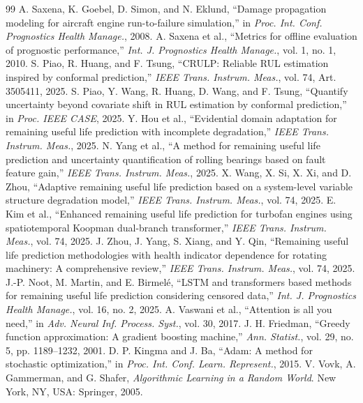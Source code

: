 \documentclass[journal]{IEEEtran}
\begin{document}
\begin{thebibliography}{99}
 A. Saxena, K. Goebel, D. Simon, and N. Eklund, ``Damage propagation modeling for aircraft engine run-to-failure simulation,'' in \emph{Proc. Int. Conf. Prognostics Health Manage.}, 2008.
 A. Saxena et al., ``Metrics for offline evaluation of prognostic performance,'' \emph{Int. J. Prognostics Health Manage.}, vol. 1, no. 1, 2010.
 S. Piao, R. Huang, and F. Tsung, ``CRULP: Reliable RUL estimation inspired by conformal prediction,'' \emph{IEEE Trans. Instrum. Meas.}, vol. 74, Art. 3505411, 2025.
 S. Piao, Y. Wang, R. Huang, D. Wang, and F. Tsung, ``Quantify uncertainty beyond covariate shift in RUL estimation by conformal prediction,'' in \emph{Proc. IEEE CASE}, 2025.
 Y. Hou et al., ``Evidential domain adaptation for remaining useful life prediction with incomplete degradation,'' \emph{IEEE Trans. Instrum. Meas.}, 2025.
 N. Yang et al., ``A method for remaining useful life prediction and uncertainty quantification of rolling bearings based on fault feature gain,'' \emph{IEEE Trans. Instrum. Meas.}, 2025.
 X. Wang, X. Si, X. Xi, and D. Zhou, ``Adaptive remaining useful life prediction based on a system-level variable structure degradation model,'' \emph{IEEE Trans. Instrum. Meas.}, vol. 74, 2025.
 E. Kim et al., ``Enhanced remaining useful life prediction for turbofan engines using spatiotemporal Koopman dual-branch transformer,'' \emph{IEEE Trans. Instrum. Meas.}, vol. 74, 2025.
 J. Zhou, J. Yang, S. Xiang, and Y. Qin, ``Remaining useful life prediction methodologies with health indicator dependence for rotating machinery: A comprehensive review,'' \emph{IEEE Trans. Instrum. Meas.}, vol. 74, 2025.
 J.-P. Noot, M. Martin, and E. Birmel\'e, ``LSTM and transformers based methods for remaining useful life prediction considering censored data,'' \emph{Int. J. Prognostics Health Manage.}, vol. 16, no. 2, 2025.
 A. Vaswani et al., ``Attention is all you need,'' in \emph{Adv. Neural Inf. Process. Syst.}, vol. 30, 2017.
 J. H. Friedman, ``Greedy function approximation: A gradient boosting machine,'' \emph{Ann. Statist.}, vol. 29, no. 5, pp. 1189--1232, 2001.
 D. P. Kingma and J. Ba, ``Adam: A method for stochastic optimization,'' in \emph{Proc. Int. Conf. Learn. Represent.}, 2015.
 V. Vovk, A. Gammerman, and G. Shafer, \emph{Algorithmic Learning in a Random World}. New York, NY, USA: Springer, 2005.

\end{thebibliography}
\end{document}
